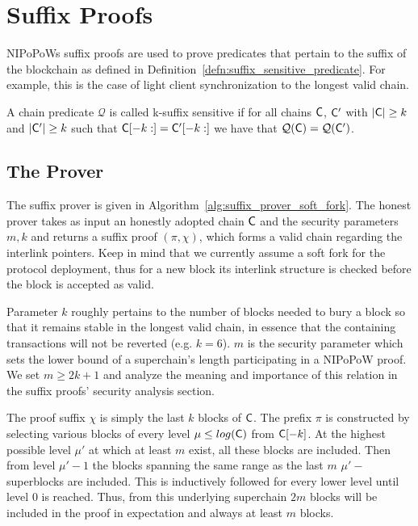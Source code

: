\section{Suffix Proofs}
NIPoPoWs suffix proofs are used to prove predicates that pertain to the suffix of the blockchain as defined in Definition~\ref{defn:suffix_sensitive_predicate}. For example, this is the case of light client synchronization to the longest valid chain.


\begin{definition}
	\label{defn:suffix_sensitive_predicate}
	A chain predicate $\mathcal{Q}$ is called k-suffix sensitive if for all chains $\mathsf{C}$, $\mathsf{C}'$ with $\lvert \mathsf{C} \rvert \geq k$ and $\lvert \mathsf{C}' \rvert \geq k$ such that $\mathsf{C}[-k:] = \mathsf{C}'[-k:]$ we have that $\mathcal{Q}(\mathsf{C}) = \mathcal{Q}(\mathsf{C}')$. 
\end{definition}

\subsection{The Prover}
The suffix prover is given in Algorithm~\ref{alg:suffix_prover_soft_fork}.
The honest prover takes as input an honestly adopted chain $\mathsf{C}$ and the security parameters $m, k$ and returns a suffix proof $(\pi, \chi)$, which forms a valid chain regarding the interlink pointers. Keep in mind that we currently assume a soft fork for the protocol deployment, thus for a new block its interlink structure is checked before the block is accepted as valid. 

Parameter $k$ roughly pertains to the number of blocks needed to bury a block so that it remains stable in the longest valid chain, in essence that the containing transactions will not be reverted (e.g. $k = 6$). $m$ is the security parameter which sets the lower bound of a superchain's length participating in a NIPoPoW proof. We set $m \geq 2k +1$ and analyze the meaning and importance of this relation in the suffix proofs' security analysis section.

The proof suffix $\chi$ is simply the last $k$ blocks of $\mathsf{C}$. The prefix $\pi$ is constructed by selecting various blocks of every level $\mu \leq log(\mathsf{C})$ from $\mathsf{C}[-k]$. At the highest possible level $\mu'$ at which at least $m$ exist, all these blocks are included. Then from level $\mu' -1$ the blocks spanning the same range as the last $m$ $\mu'-$superblocks are included. This is inductively followed for every lower level until level 0 is reached. Thus, from this underlying superchain $2m$ blocks will be included in the proof in expectation and always at least $m$ blocks.


